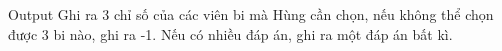 Output
Ghi ra 3 chỉ số của các viên bi mà Hùng cần chọn, nếu không thể chọn được 3 bi nào, ghi ra -1. Nếu có nhiều đáp án, ghi ra một đáp án bất kì.